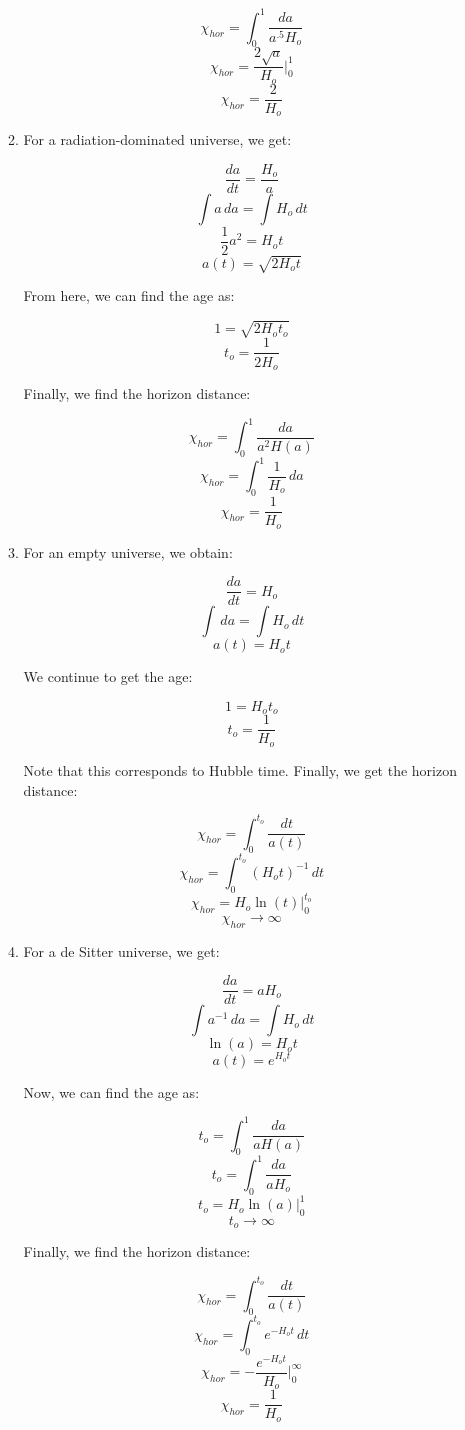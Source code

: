 \begin{enumerate}
\begin{enumerate}
        $$\chi_{hor}=\int_0^1 \frac{da}{a^{.5}H_o}$$
        $$\chi_{hor}=\frac{2\sqrt{a}}{H_o}\Big|_0^1$$
        $$\boxed{\chi_{hor}=\frac{2}{H_o}}$$

      \item 

        For a radiation-dominated universe, we get:

        $$\frac{da}{dt}=\frac{H_o}{a}$$
        $$\int a\,da=\int H_o\,dt$$
        $$\frac{1}{2}a^2=H_ot$$
        $$\boxed{a(t)=\sqrt{2H_ot}}$$

        From here, we can find the age as:

        $$1=\sqrt{2H_ot_o}$$
        $$\boxed{t_o=\frac{1}{2H_o}}$$

        Finally, we find the horizon distance:

        $$\chi_{hor}=\int_0^{1}\frac{da}{a^2H(a)}$$
        $$\chi_{hor}=\int_0^1\frac{1}{H_o}\,da$$
        $$\boxed{\chi_{hor}=\frac{1}{H_o}}$$

      \item 

        For an empty universe, we obtain:

        $$\frac{da}{dt}=H_o$$
        $$\int \,da=\int H_o\,dt$$
        $$\boxed{a(t)=H_o t}$$

        We continue to get the age:

        $$1=H_ot_o$$
        $$\boxed{t_o=\frac{1}{H_o}}$$

        Note that this corresponds to Hubble time. Finally, we get the horizon distance:

        $$\chi_{hor}=\int_0^{t_o}\frac{dt}{a(t)}$$
        $$\chi_{hor}=\int_0^{t_o}(H_ot)^{-1}\,dt$$
        $$\chi_{hor}=H_o\ln(t)\Big|_0^{t_o}$$
        $$\chi_{hor}\to\infty$$

      \item For a de Sitter universe, we get:

        $$\frac{da}{dt}=aH_o$$
        $$\int a^{-1}\,da=\int H_o\,dt$$
        $$\ln(a)=H_o t$$
        $$\boxed{a(t)=e^{H_o t}}$$

        Now, we can find the age as:

        $$t_o=\int_0^1\frac{da}{aH(a)}$$
        $$t_o=\int_0^1\frac{da}{aH_o}$$
        $$t_o=H_o\ln(a)\Big|_0^1$$
        $$t_o\to\infty$$

        Finally, we find the horizon distance:

        $$\chi_{hor}=\int_0^{t_o} \frac{dt}{a(t)}$$
        $$\chi_{hor}=\int_0^{t_o} e^{-H_ot}\,dt$$
        $$\chi_{hor}=-\frac{e^{-H_ot}}{H_o}\Big|_0^{\infty}$$
        $$\boxed{\chi_{hor}=\frac{1}{H_o}}$$


\end{enumerate}
\end{enumerate}
